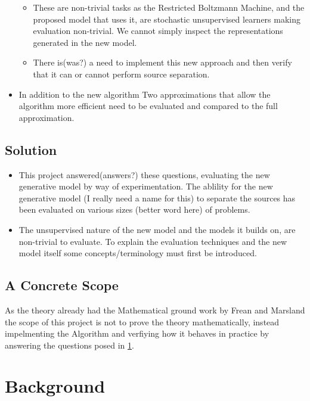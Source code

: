 \begin{itemize}
\begin{itemize}
\begin{itemize}
    \end{itemize}
    \item These are non-trivial tasks as the Restricted Boltzmann Machine, and the proposed model that uses it, are stochastic unsupervised learners making evaluation non-trivial. We cannot simply inspect the representations generated in the new model.
    \item There is(was?) a need to implement this new approach and then verify that it can or cannot perform source separation.
  \end{itemize}
  \item In addition to the new algorithm Two approximations that allow the algorithm
  more efficient need to be evaluated and compared to the full approximation.
\end{itemize}

\section{Solution}\label{Sec:Intro:Solution}

\begin{itemize}
  \item This project answered(answers?) these questions, evaluating the new generative model by way of experimentation. The ablility for the new generative model (I really need a name for this)  to separate the sources has been evaluated on various sizes (better word here) of problems.
  \item The unsupervised nature of the new model and the models it builds on, are non-trivial to evaluate. To explain the evaluation techniques and the new model itself some concepts/terminology must first be introduced.
\end{itemize}

\section{A Concrete Scope}

As the theory already had the Mathematical ground work by Frean and Marsland the scope of this project is not to prove the theory mathematically, instead impelmenting the Algorithm and verfiying how it behaves in practice by answering the questions posed in \ref{Sec:Intro:Solution}.

\chapter{Background}


